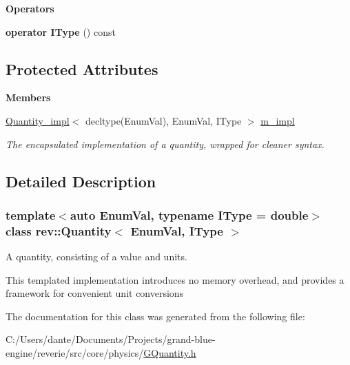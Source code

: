 \begin{Indent}\textbf{ Operators}\par
\begin{DoxyCompactItemize}
\item 
\mbox{\label{classrev_1_1_quantity_a36865cf4903dde1b45134d1a1097c766}} 
{\bfseries operator I\+Type} () const
\end{DoxyCompactItemize}
\end{Indent}
\subsection*{Protected Attributes}
\begin{Indent}\textbf{ Members}\par
\begin{DoxyCompactItemize}
\item 
\mbox{\label{classrev_1_1_quantity_a0279cbafcc6e1ce2ea3a708916dfea9b}} 
\mbox{\hyperlink{classrev_1_1_quantity__impl}{Quantity\+\_\+impl}}$<$ decltype(Enum\+Val), Enum\+Val, I\+Type $>$ \mbox{\hyperlink{classrev_1_1_quantity_a0279cbafcc6e1ce2ea3a708916dfea9b}{m\+\_\+impl}}
\begin{DoxyCompactList}\small\item\em The encapsulated implementation of a quantity, wrapped for cleaner syntax. \end{DoxyCompactList}\end{DoxyCompactItemize}
\end{Indent}


\subsection{Detailed Description}
\subsubsection*{template$<$auto Enum\+Val, typename I\+Type = double$>$\newline
class rev\+::\+Quantity$<$ Enum\+Val, I\+Type $>$}

A quantity, consisting of a value and units. 

This templated implementation introduces no memory overhead, and provides a framework for convenient unit conversions 

The documentation for this class was generated from the following file\+:\begin{DoxyCompactItemize}
\item 
C\+:/\+Users/dante/\+Documents/\+Projects/grand-\/blue-\/engine/reverie/src/core/physics/\mbox{\hyperlink{_g_quantity_8h}{G\+Quantity.\+h}}\end{DoxyCompactItemize}
